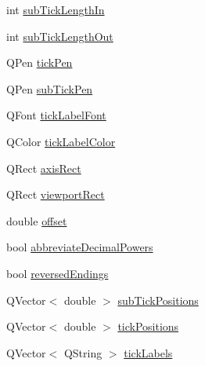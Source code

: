 \begin{DoxyCompactItemize}
\item 
int \hyperlink{classQCPAxisPainterPrivate_af11f7d83021c9cb3b0e76fe7814c6110}{sub\+Tick\+Length\+In}
\item 
int \hyperlink{classQCPAxisPainterPrivate_a5f1afddc3dc7ccc4d5adcbcd8f0c2218}{sub\+Tick\+Length\+Out}
\item 
Q\+Pen \hyperlink{classQCPAxisPainterPrivate_a389dde97f02fdee23965e4736e7d8c62}{tick\+Pen}
\item 
Q\+Pen \hyperlink{classQCPAxisPainterPrivate_a9b9cf594cd16575f52ecda9abef4e412}{sub\+Tick\+Pen}
\item 
Q\+Font \hyperlink{classQCPAxisPainterPrivate_a06cb4b185feb1e560e01d65887e4d80d}{tick\+Label\+Font}
\item 
Q\+Color \hyperlink{classQCPAxisPainterPrivate_a88032cf15c997e3956b79617b859e8ad}{tick\+Label\+Color}
\item 
Q\+Rect \hyperlink{classQCPAxisPainterPrivate_afcd55b0e1ecd689fffd2b1fc75dc7732}{axis\+Rect}
\item 
Q\+Rect \hyperlink{classQCPAxisPainterPrivate_a8627dc6b40781e3291bb508e4ac574d6}{viewport\+Rect}
\item 
double \hyperlink{classQCPAxisPainterPrivate_aea226a1e39357d71f66d85093e30a830}{offset}
\item 
bool \hyperlink{classQCPAxisPainterPrivate_a68353c2eeabd00d96a2e36a0b3809cb2}{abbreviate\+Decimal\+Powers}
\item 
bool \hyperlink{classQCPAxisPainterPrivate_a06d0ef3f4f1b567feb84196fc3b140da}{reversed\+Endings}
\item 
Q\+Vector$<$ double $>$ \hyperlink{classQCPAxisPainterPrivate_afcde7484bbcc1004b8f59ab984ada6f9}{sub\+Tick\+Positions}
\item 
Q\+Vector$<$ double $>$ \hyperlink{classQCPAxisPainterPrivate_ae55e3dc2cf2af8d8a6e7235ccab54786}{tick\+Positions}
\item 
Q\+Vector$<$ Q\+String $>$ \hyperlink{classQCPAxisPainterPrivate_ad0a4998ca358ba751e84fca45a025abd}{tick\+Labels}
\end{DoxyCompactItemize}
